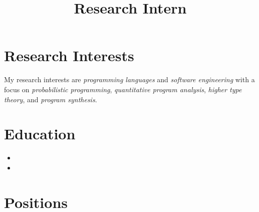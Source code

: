 \documentclass[11pt,letterpaper,sans]{moderncv}        %
\title{Research Intern}                               %
\begin{document}
\makecvtitle


\vspace{-3em}

\section{Research Interests}

My research interests are \emph{programming languages} and \emph{software engineering} with a focus on \emph{probabilistic programming}, \emph{quantitative program analysis}, \emph{higher type theory}, and \emph{program synthesis}.

\section{Education}

\begin{itemize}
	\item{}
	
	\vspace{5pt}
	
	\item{}
\end{itemize}

\section{Positions}
\end{document}
